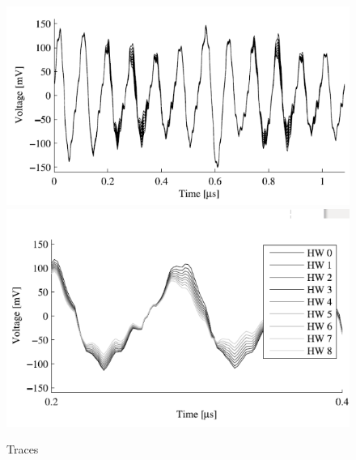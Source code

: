 \begin{figure}[htp]
\centering
\includegraphics[scale=0.30]{images/Lecture_5/trace1.png}
\includegraphics[scale=0.30]{images/Lecture_5/trace2.png}
\caption{Traces}\label{fig:traces}
\end{figure}

